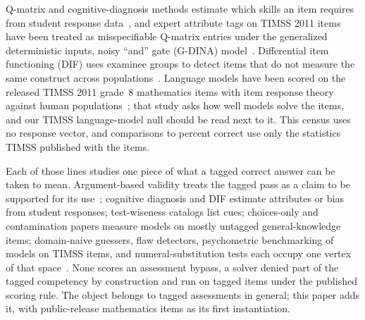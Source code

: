 Q-matrix and cognitive-diagnosis methods estimate which skills an item requires from student response data~\cite{Tatsuoka_1983,de_la_Torre_Chiu_2016}, and expert attribute tags on TIMSS 2011 items have been treated as misspecifiable Q-matrix entries under the generalized deterministic inputs, noisy ``and'' gate (G-DINA) model~\cite{Terzi_Sen_2019}. Differential item functioning (DIF) uses examinee groups to detect items that do not measure the same construct across populations~\cite{Holland_Thayer_1986}. Language models have been scored on the released TIMSS 2011 grade~8 mathematics items with item response theory against human populations~\cite{fang-etal-2025-patch}; that study asks how well models solve the items, and our TIMSS language-model null should be read next to it. This census uses no response vector, and comparisons to percent correct use only the statistics TIMSS published with the items.

Each of those lines studies one piece of what a tagged correct answer can be taken to mean. Argument-based validity treats the tagged pass as a claim to be supported for its use~\cite{Kane_1992,Kane_2013,Messick_1995,aera2014standards}; cognitive diagnosis and DIF estimate attributes or bias from student responses; test-wiseness catalogs list cues; choices-only and contamination papers measure models on mostly untagged general-knowledge items; domain-naive guessers, flaw detectors, psychometric benchmarking of models on TIMSS items, and numeral-substitution tests each occupy one vertex of that space~\cite{Watson_2018,Moore_2024,fang-etal-2025-patch,mirzadeh2025gsmsymbolic}. None scores an assessment bypass, a solver denied part of the tagged competency by construction and run on tagged items under the published scoring rule. The object belongs to tagged assessments in general; this paper adds it, with public-release mathematics items as its first instantiation.
